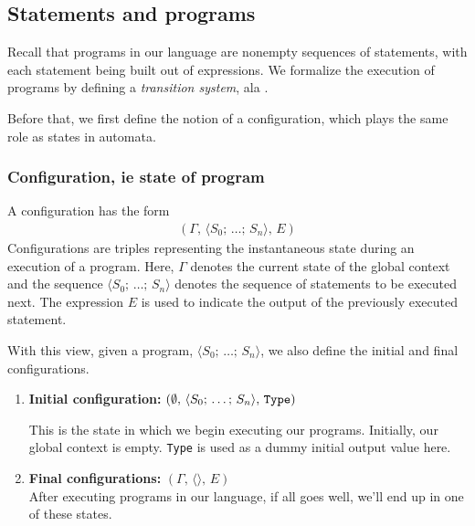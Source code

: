 \documentclass{article}
\begin{document}
\subsection{Statements and programs}
\begin{comment}
  Follows this approach:
  https://www.cs.cornell.edu/courses/cs6110/2013sp/lectures/lec05-sp13.pdf
\end{comment}

Recall that programs in our language are nonempty sequences of statements,
with each statement being built out of expressions.
We formalize the execution of programs by defining a
\textit{transition system}, ala \cite{plotkin_sos}.

Before that, we first define the notion of a configuration, which plays the
same role as states in automata. 

\subsubsection{Configuration, ie state of program}
A configuration has the form
\begin{align*}
  (\Gamma, \, \langle S_0; \, \dots; \, S_n \rangle, \, E)
\end{align*}
Configurations are triples representing the instantaneous state during an
execution of a program. Here, $\Gamma$ denotes the current state of the
global context and the sequence $\langle S_0; \, \dots; \, S_n \rangle$ denotes
the sequence of statements to be executed next. 
The expression $E$ is used to indicate the output of the previously executed
statement.

With this view, given a program, $\langle S_0; \, \dots; \, S_n
\rangle$, we also define the initial and final configurations.
\begin{enumerate}
\item \textbf{Initial configuration:}
  $ (\emptyset, \, \langle S_0; \, \dots; \, S_n \rangle, \, \texttt{Type})$

  This is the state in which we begin executing our programs.
  Initially, our global context is empty.
  \texttt{Type} is used as a dummy initial output value here.

\item \textbf{Final configurations:} $(\Gamma, \, \langle \rangle, \, E)$ \\
After executing programs in our language, if all goes well, we'll end up in
one of these states.
\end{enumerate}
\end{document}
